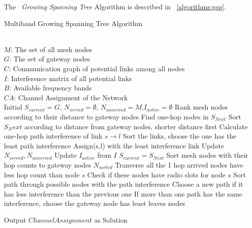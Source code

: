 The ~\emph{Growing Spanning Tree} Algorithm is described in ~\ref{algorithms:gsp}.







\begin{algorithm}
    \small
\caption{Multiband Growing Spanning Tree Algorithm}
\label{algorithms:gsp}
\begin{algorithmic}[1]
\REQUIRE  ~~\\
	 $M$: The set of all mesh nodes\\
	 $G$: The set of gateway nodes\\
	 $C$: Communication graph of potential links among all nodes\\
	 $I$: Interference matrix of all potential links \\
	 $B$: Available frequency bands
\ENSURE ~~\\    
$CA$: Channel Assignment of the Network\\
\STATE Initial $S_{current}=G$, $N_{served}=\emptyset$, $N_{unserved}=M$,$I_{active}=\emptyset$
\STATE Rank mesh nodes according to their distance to gateway nodes
	\STATE Find one-hop nodes in $S_{Next}$
	\STATE Sort $S_Next$ according to distance from gateway nodes, shorter distance first
		\STATE Calculate one-hop path interference of link $s\rightarrow l$
		\STATE Sort the links, choose the one has the least path interference
		\STATE Assign(s,l) with the least interference link
		\STATE Update $N_{served},N_{unserved}$
		\STATE Update $I_{active}$ from $I$
	\ENDFOR
	\STATE $S_{current}=S_{Next}$
\ENDFOR
\ENDWHILE
\STATE Sort mesh nodes with their hop counts to gateway nodes $N_{sorted}$
	\STATE Tranverse all the 1 hop arrived nodes have less hop count than node $s$ 
	\STATE Check if these nodes have radio slots for node $s$
	\STATE Sort path through possible nodes with the path interference
	\STATE Choose a new path if it has less interference than the previous one
	\STATE If more than one path has the same interference, choose the gateway node has least leaves nodes 
\ENDFOR
\ENDWHILE

Output $Channel Assignment$ as Solution
\end{algorithmic}
\end{algorithm}
      

